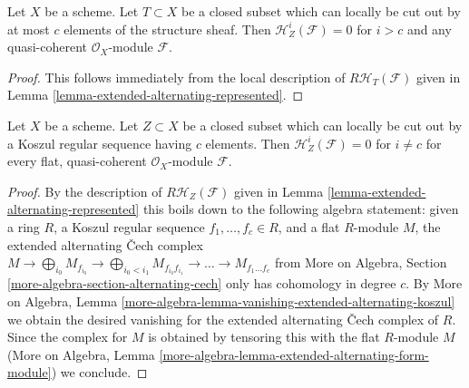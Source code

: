 \begin{lemma}
\label{lemma-supported-trivial-vanishing}
Let $X$ be a scheme. Let $T \subset X$ be a closed subset which can
locally be cut out by at most $c$ elements of the structure sheaf.
Then $\mathcal{H}^i_Z(\mathcal{F}) = 0$ for $i > c$ and any
quasi-coherent $\mathcal{O}_X$-module $\mathcal{F}$.
\end{lemma}

\begin{proof}
This follows immediately from the local description of
$R\mathcal{H}_T(\mathcal{F})$ given in
Lemma \ref{lemma-extended-alternating-represented}.
\end{proof}

\begin{lemma}
\label{lemma-supported-vanishing}
Let $X$ be a scheme. Let $Z \subset X$ be a closed subset which can
locally be cut out by a Koszul regular sequence having $c$ elements.
Then $\mathcal{H}^i_Z(\mathcal{F}) = 0$ for $i \not = c$ for every
flat, quasi-coherent $\mathcal{O}_X$-module $\mathcal{F}$.
\end{lemma}

\begin{proof}
By the description of $R\mathcal{H}_Z(\mathcal{F})$ given in
Lemma \ref{lemma-extended-alternating-represented} this boils
down to the following algebra statement: given a ring $R$,
a Koszul regular sequence $f_1, \ldots, f_c \in R$, and a flat
$R$-module $M$, the extended alternating {\v C}ech complex
$M \to \bigoplus\nolimits_{i_0} M_{f_{i_0}} \to
\bigoplus\nolimits_{i_0 < i_1} M_{f_{i_0}f_{i_1}} \to
\ldots \to M_{f_1 \ldots f_c}$
from More on Algebra, Section \ref{more-algebra-section-alternating-cech}
only has cohomology in degree $c$. By More on Algebra, Lemma
\ref{more-algebra-lemma-vanishing-extended-alternating-koszul}
we obtain the desired vanishing for the extended alternating
{\v C}ech complex of $R$. Since the complex for $M$ is obtained
by tensoring this with the flat $R$-module $M$
(More on Algebra, Lemma
\ref{more-algebra-lemma-extended-alternating-form-module})
we conclude.
\end{proof}


